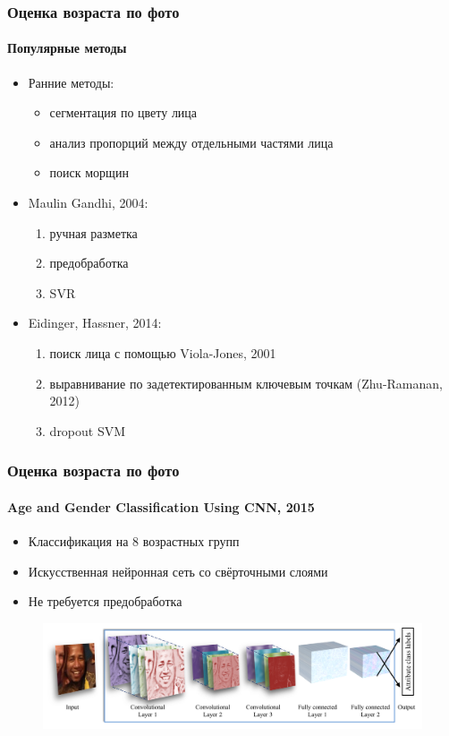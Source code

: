 \documentclass{beamer}
\begin{document}
  \begin{frame}
  	\frametitle{Оценка возраста по фото}
  	\framesubtitle{Популярные методы}
  	\begin{itemize}
  	\item Ранние методы:
  		\begin{itemize}
  			\item сегментация по цвету лица
  			\item анализ пропорций между отдельными частями лица
  			\item поиск морщин
  		\end{itemize}

	\vspace{1em}	

  	\item Maulin Gandhi, 2004:
		\begin{enumerate}
			\item ручная разметка		
			\item предобработка
			\item SVR
		\end{enumerate}
		
	\vspace{1em}	
	 	 	 
  	\item Eidinger, Hassner, 2014:
		\begin{enumerate}
  			\item поиск лица с помощью Viola-Jones, 2001
  			\item выравнивание по задетектированным ключевым точкам (Zhu-Ramanan, 2012)
  			\item dropout SVM
  		\end{enumerate}  	
  	\end{itemize}  	
  \end{frame}
  
  \begin{frame}
  	\frametitle{Оценка возраста по фото}
   	\framesubtitle{Age and Gender Classification Using CNN, 2015}
   	\begin{itemize}
   		\item Классификация на 8 возрастных групп
   		\item Искусственная нейронная сеть со свёрточными слоями
   		\item Не требуется предобработка
	\end{itemize}	
	\begin{figure}
		\includegraphics[width=\textwidth]{cnn.png}
	\end{figure}
  \end{frame}
    
\end{document}
